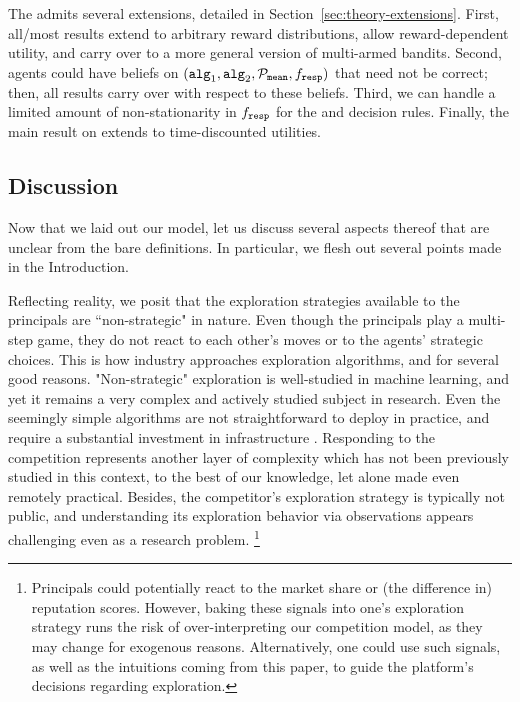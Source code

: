 

 The \TheoryModel admits several extensions, detailed in Section~\ref{sec:theory-extensions}. First, all/most results extend to arbitrary reward distributions, allow reward-dependent utility, and carry over to a more general version of multi-armed bandits. Second, agents could have beliefs on $(\alg[1],\alg[2],\priorMu,\respF)$ that need not be correct; then, all results carry over with respect to these beliefs.
Third, we can handle a limited amount of non-stationarity in $\respF$ for the \HardMaxRandom and \SoftMaxRandom decision rules. Finally, the main result on \HardMax extends to time-discounted utilities.


\subsection{Discussion}
\label{sec:discussion}

Now that we laid out our model, let us discuss several aspects thereof that are unclear from the bare definitions. In particular, we flesh out several points made in the Introduction.

Reflecting reality, we posit that the exploration strategies available to the principals are ``non-strategic" in nature. Even though the principals play a multi-step game, they do not react to each other's moves or to the agents' strategic choices. This is how industry approaches exploration algorithms, and for several good reasons. "Non-strategic" exploration is well-studied in machine learning, and yet it remains a very complex and actively studied subject in research. Even the seemingly simple algorithms are not straightforward to deploy in practice, and require a substantial investment in infrastructure \cite[\eg see the discussions in][]{DS-arxiv}. Responding to the competition represents another layer of complexity which has not been previously studied in this context, to the best of our knowledge, let alone made even remotely practical. Besides, the competitor's exploration strategy is typically not public, and understanding its exploration behavior via observations appears challenging even as a  research problem.%
\footnote{Principals could potentially react to the market share or (the difference in) reputation scores. However, baking these signals into one's exploration strategy runs the risk of over-interpreting our competition model, as they may change for exogenous reasons. Alternatively, one could use such signals, as well as the intuitions coming from this paper, to guide the platform's decisions regarding exploration.}


